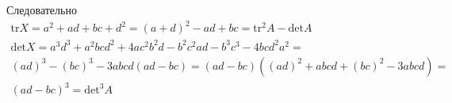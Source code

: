 Следовательно
\begin{gather*}
	\text{tr}X = a^2 + ad + bc + d^2 = (a+d)^2 - ad + bc =\text{tr}^{2} A - \text{det} A\\
	\text{det}X = 
	a^3d^3+a^2bcd^2+4ac^2b^2d-b^2c^2ad-b^3c^3-4bcd^2a^2 = \\
	(ad)^3-(bc)^3-3abcd(ad-bc) = 
	(ad-bc)((ad)^2+abcd+(bc)^2-3abcd) = \\
	(ad-bc)^3 = 
	\text{det}^3A
\end{gather*}
		